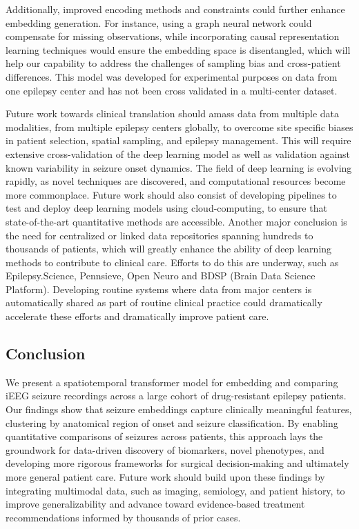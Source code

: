 \documentclass[11pt]{article}
\begin{document}
Additionally, improved encoding methods and constraints could further enhance embedding generation. For instance, using a graph neural network could compensate for missing observations, while incorporating causal representation learning techniques would ensure the embedding space is disentangled, which will help our capability to address the challenges of sampling bias and cross-patient differences. This model was developed for experimental purposes on data from one epilepsy center and has not been cross validated in a multi-center dataset. 

Future work towards clinical translation should amass data from multiple data modalities, from multiple epilepsy centers globally, to overcome site specific biases in patient selection, spatial sampling, and epilepsy management. This will require extensive cross-validation of the deep learning model as well as validation against known variability in seizure onset dynamics. The field of deep learning is evolving rapidly, as novel techniques are discovered, and computational resources become more commonplace. Future work should also consist of developing pipelines to test and deploy deep learning models using cloud-computing, to ensure that state-of-the-art quantitative methods are accessible. Another major conclusion is the need for centralized or linked data repositories spanning hundreds to thousands of patients, which will greatly enhance the ability of deep learning methods to contribute to clinical care. Efforts to do this are underway, such as Epilepsy.Science, Pennsieve\cite{goldblum2024pennsieve}, Open Neuro\cite{Markiewicz2021The} and BDSP (Brain Data Science Platform)\cite{sun_harvard_2025}. Developing routine systems where data from major centers is automatically shared as part of routine clinical practice could dramatically accelerate these efforts and dramatically improve patient care. 

\subsection*{Conclusion}
We present a spatiotemporal transformer model for embedding and comparing iEEG seizure recordings across a large cohort of drug-resistant epilepsy patients. Our findings show that seizure embeddings capture clinically meaningful features, clustering by anatomical region of onset and seizure classification. By enabling quantitative comparisons of seizures across patients, this approach lays the groundwork for data-driven discovery of biomarkers, novel phenotypes, and developing more rigorous frameworks for surgical decision-making and ultimately more general patient care. Future work should build upon these findings by integrating multimodal data, such as imaging, semiology, and patient history, to improve generalizability and advance toward evidence-based treatment recommendations informed by thousands of prior cases.
\end{document}
